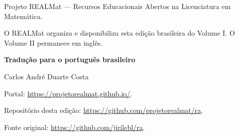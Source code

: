 \documentclass[12pt]{book}
\theoremstyle{plain}
\theoremstyle{remark}
\theoremstyle{definition}
\theoremstyle{exercise}
\theoremstyle{example}
\begin{document}
\bigskip
\noindent
Projeto REALMat — Recursos Educacionais Abertos na Licenciatura em Matemática.

\medskip
\noindent
O REALMat organiza e disponibiliza esta edição brasileira do Volume I. O Volume II permanece em inglês.

\medskip
\noindent
\textbf{Tradução para o português brasileiro}\par
\smallskip
Carlos André Duarte Costa

\medskip
\noindent

\bigskip
\noindent
Portal: \url{https://projetorealmat.github.io/}.

\smallskip
\noindent
Repositório desta edição: \url{https://github.com/projetorealmat/ra}.

\smallskip
\noindent
Fonte original: \url{https://github.com/jirilebl/ra}.

\clearpage


\tableofcontents
{}

\newpage


\newcommand{\VolOneIntroExtrahead}{}
\newcommand{\VolTwoIntro}{}















\end{document}
